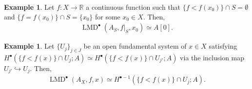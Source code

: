 \documentclass[a4paper,dvipdfmx,reqno,12pt]{amsart}
\theoremstyle{definition}
\newtheorem{example}[theorem]{Example}
\newcommand{\opn}[1]{\operatorname{#1}}
\newcommand{\hookto}{\hookrightarrow}
\numberwithin{equation}{section}
\begin{document}
\begin{example}
Let $f\colon X \to \mathbb{R}$ a continuous function 
such that $\{f<f(x_0)\}\cap S=\emptyset$ and 
$\{f=f(x_0)\}\cap S=\{x_0\}$ for some $x_0\in X$. 
Then,
\begin{align}
\opn{LMD}^{\bullet}(A_S,f|_{S},x_0)\simeq A[0].
\end{align}

\end{example}

\begin{example} \label{example-fundamental-system}
Let $\{U_j\}_{j\in J}$ be an open fundamental system of 
$x\in X$ satisfying
$H^{\bullet}(\{f<f(x)\}\cap U_j;A)\simeq 
H^{\bullet}(\{f<f(x)\}\cap U_{j'};A)$ via the 
inclusion map $U_{j'}\hookto U_j$. Then, 
\begin{align}
\opn{LMD}^{\bullet}(A_X,f,x)\simeq H^{\bullet-1}(\{f<f(x)\}\cap U_j;A).
\end{align}

\end{example}
\end{document}
